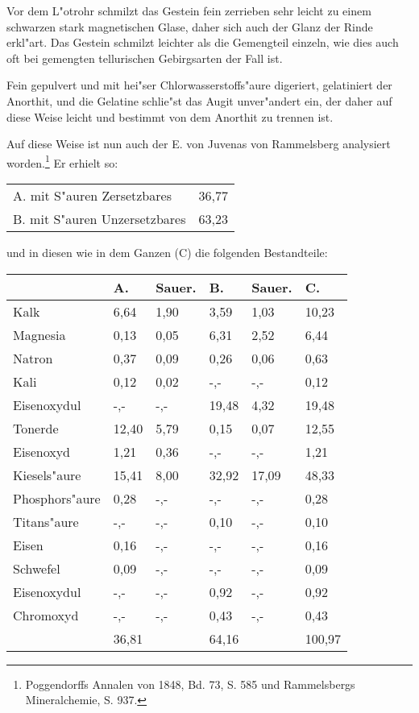 \documentclass[a4paper, 11pt, oneside]{article}
\begin{document}
Vor dem L"otrohr schmilzt das Gestein fein zerrieben sehr leicht zu einem schwarzen stark magnetischen Glase, daher sich auch der Glanz der Rinde erkl"art. Das Gestein schmilzt leichter als die Gemengteil einzeln, wie dies auch oft bei gemengten tellurischen Gebirgsarten der Fall ist.

Fein gepulvert und mit hei"ser Chlorwasserstoffs"aure digeriert, gelatiniert der Anorthit, und die Gelatine schlie"st das Augit unver"andert ein, der daher auf diese Weise leicht und bestimmt von dem Anorthit zu trennen ist.

Auf diese Weise ist nun auch der E. von Juvenas von Rammelsberg analysiert worden.\footnote{Poggendorffs Annalen von 1848, Bd. 73, S. 585 und Rammelsbergs Mineralchemie, S. 937.} Er erhielt so:
\begin{center}
\begin{tabular}{ l r }
    A. mit S"auren Zersetzbares & 36,77\\
    B. mit S"auren Unzersetzbares & 63,23\\
\end{tabular}
\end{center}
und in diesen wie in dem Ganzen (C) die folgenden Bestandteile:
\begin{center}
\end{center}
\begin{center}
\begin{tabular}{ |p{23mm}|p{12mm}|p{8mm}|p{13mm}|p{8mm}|p{11mm}| }
    \hline
     & A. & Sauer. & B. & Sauer. & C.\\
    \hline\hline
    Kalk & 6,64 & 1,90 & 3,59 & 1,03 & 10,23\\\hline
    Magnesia & 0,13 & 0,05 & 6,31 & 2,52 & 6,44\\\hline
    Natron & 0,37 & 0,09 & 0,26 & 0,06 & 0,63\\\hline
    Kali & 0,12 & 0,02 & -,- & -,- & 0,12\\\hline
    Eisenoxydul & -,- & -,- & 19,48 & 4,32 & 19,48\\\hline
    Tonerde & 12,40 & 5,79 & 0,15 & 0,07 & 12,55\\\hline
    Eisenoxyd & 1,21 & 0,36 & -,- & -,- & 1,21\\\hline
    Kiesels"aure & 15,41 & 8,00 & 32,92 & 17,09 & 48,33\\\hline
    Phosphors"aure & 0,28 & -,- & -,- & -,- & 0,28\\\hline
    Titans"aure & -,- & -,- & 0,10 & -,- & 0,10\\\hline
    Eisen & 0,16 & -,- & -,- & -,- & 0,16\\\hline
    Schwefel & 0,09 & -,- & -,- & -,- & 0,09\\\hline
    Eisenoxydul & -,- & -,- & 0,92 & -,- & 0,92\\\hline
    Chromoxyd & -,- & -,- & 0,43 & -,- & 0,43\\\hline
     & 36,81 & & 64,16 & & 100,97\\
    \hline
\end{tabular}
\end{center}
\end{document}
